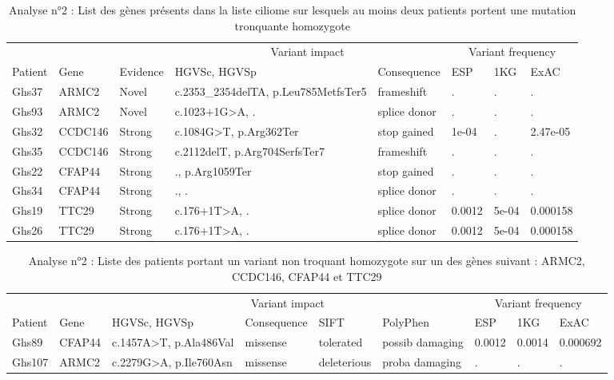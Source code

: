 \documentclass[12pt,twoside]{reedthesis}
\theoremstyle{definition}
\theoremstyle{definition}
\theoremstyle{remark}
\begin{document}
  \begin{landscape}
  \begin{longtable}[t]{llllllll}
  \caption{\label{tab:tabgrp1high}Analyse n°2 : List des gènes présents dans la liste ciliome sur lesquels au moins deux patients portent une mutation tronquante homozygote}\\
  \toprule
  \multicolumn{1}{c}{ } & \multicolumn{1}{c}{ } & \multicolumn{1}{c}{ } & \multicolumn{2}{c}{Variant impact} & \multicolumn{3}{c}{Variant frequency} \\
  \cmidrule(l{2pt}r{2pt}){4-5} \cmidrule(l{2pt}r{2pt}){6-8}
  Patient & Gene & Evidence & HGVSc, HGVSp & Consequence & ESP & 1KG & ExAC\\
  \midrule
  Ghs37 & ARMC2 & Novel & c.2353\_2354delTA, p.Leu785MetfsTer5 & frameshift & . & . & .\\
  Ghs93 & ARMC2 & Novel & c.1023+1G>A, . & splice donor & . & . & .\\
  Ghs32 & CCDC146 & Strong & c.1084G>T, p.Arg362Ter & stop gained & 1e-04 & . & 2.47e-05\\
  Ghs35 & CCDC146 & Strong & c.2112delT, p.Arg704SerfsTer7 & frameshift & . & . & .\\
  Ghs22 & CFAP44 & Strong & ., p.Arg1059Ter & stop gained & . & . & .\\
  \addlinespace
  Ghs34 & CFAP44 & Strong & ., . & splice donor & . & . & .\\
  Ghs19 & TTC29 & Strong & c.176+1T>A, . & splice donor & 0.0012 & 5e-04 & 0.000158\\
  Ghs26 & TTC29 & Strong & c.176+1T>A, . & splice donor & 0.0012 & 5e-04 & 0.000158\\
  \bottomrule
  \end{longtable}
  \end{landscape}
  
  \begin{landscape}
  \begin{longtable}[t]{lllllllll}
  \caption{\label{tab:tabgrp1moderate}Analyse n°2 : Liste des patients portant un variant non troquant homozygote sur un des gènes suivant : ARMC2, CCDC146, CFAP44  et  TTC29}\\
  \toprule
  \multicolumn{1}{c}{ } & \multicolumn{1}{c}{ } & \multicolumn{4}{c}{Variant impact} & \multicolumn{3}{c}{Variant frequency} \\
  \cmidrule(l{2pt}r{2pt}){3-6} \cmidrule(l{2pt}r{2pt}){7-9}
  Patient & Gene & HGVSc, HGVSp & Consequence & SIFT & PolyPhen & ESP & 1KG & ExAC\\
  \midrule
  Ghs89 & CFAP44 & c.1457A>T, p.Ala486Val & missense & tolerated & possib damaging & 0.0012 & 0.0014 & 0.000692\\
  Ghs107 & ARMC2 & c.2279G>A, p.Ile760Asn & missense & deleterious & proba damaging & . & . & .\\
  \bottomrule
  \end{longtable}
  \end{landscape}
  
\end{document}

